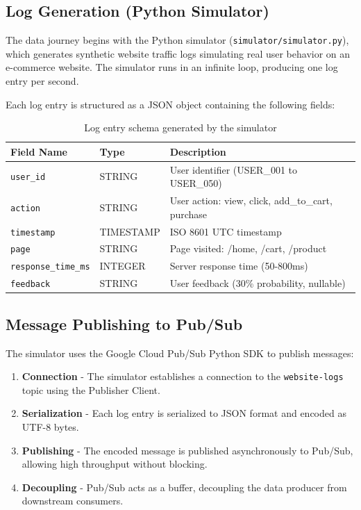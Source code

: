 \documentclass[12pt,a4paper]{article}
\begin{document}
\subsection{Log Generation (Python Simulator)}

The data journey begins with the Python simulator (\texttt{simulator/simulator.py}), which generates synthetic website traffic logs simulating real user behavior on an e-commerce website. The simulator runs in an infinite loop, producing one log entry per second.

Each log entry is structured as a JSON object containing the following fields:

\begin{table}[H]
\centering
\begin{tabular}{|l|l|p{7cm}|}
\hline
\textbf{Field Name} & \textbf{Type} & \textbf{Description} \\
\hline
\texttt{user\_id} & STRING & User identifier (USER\_001 to USER\_050) \\
\hline
\texttt{action} & STRING & User action: view, click, add\_to\_cart, purchase \\
\hline
\texttt{timestamp} & TIMESTAMP & ISO 8601 UTC timestamp \\
\hline
\texttt{page} & STRING & Page visited: /home, /cart, /product \\
\hline
\texttt{response\_time\_ms} & INTEGER & Server response time (50-800ms) \\
\hline
\texttt{feedback} & STRING & User feedback (30\% probability, nullable) \\
\hline
\end{tabular}
\caption{Log entry schema generated by the simulator}
\end{table}

\subsection{Message Publishing to Pub/Sub}

The simulator uses the Google Cloud Pub/Sub Python SDK to publish messages:

\begin{enumerate}
    \item \textbf{Connection} - The simulator establishes a connection to the \texttt{website-logs} topic using the Publisher Client.
    \item \textbf{Serialization} - Each log entry is serialized to JSON format and encoded as UTF-8 bytes.
    \item \textbf{Publishing} - The encoded message is published asynchronously to Pub/Sub, allowing high throughput without blocking.
    \item \textbf{Decoupling} - Pub/Sub acts as a buffer, decoupling the data producer from downstream consumers.
\end{enumerate}
\end{document}
